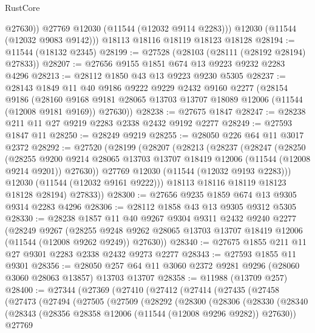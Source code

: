 \begin{lexlean}{RustCore}
\begin{coremodule}
            @27630))
        @27769
        @12030
        (@11544 (@12032 @9114 @2283)))
      @12030
      (@11544 (@12032 @9083 @9142)))
    @18113
    @18116
    @18119
    @18123
    @18128
@28194 := @11544 (@18132 @2345)
@28199 := @27528 (@28103 (@28111 (@28192 @28194) @27833))
@28207 := @27656 @9155 @1851 @674 @13 @9223 @9232 @2283 @4296
@28213 := @28112 @1850 @43 @13 @9223 @9230 @5305
@28237 := @28143
    @1849
    @11
    @40
    @9186
    @9222
    @9229
    @2432
    @9160
    @2277
    (@28154
      @9186
      (@28160 @9168 @9181 @28065 @13703 @13707 @18089 @12006 (@11544 (@12008 @9181 @9169)) @27630))
@28238 := @27675 @1847
@28247 := @28238 @211 @11 @27 @9219 @2283 @2338 @2432 @9192 @2277
@28249 := @27593 @1847 @11
@28250 := @28249 @9219
@28255 := @28050 @226 @64 @11 @3017 @2372
@28292 := @27520
    (@28199
      (@28207
        (@28213
          (@28237
            (@28247
              (@28250
                (@28255
                  @9200
                  @9214
                  @28065
                  @13703
                  @13707
                  @18419
                  @12006
                  (@11544 (@12008 @9214 @9201))
                  @27630))
              @27769
              @12030
              (@11544 (@12032 @9193 @2283)))
            @12030
            (@11544 (@12032 @9161 @9222)))
          @18113
          @18116
          @18119
          @18123
          @18128
          @28194)
        @27833))
@28300 := @27656 @9235 @1859 @674 @13 @9305 @9314 @2283 @4296
@28306 := @28112 @1858 @43 @13 @9305 @9312 @5305
@28330 := @28238
    @1857
    @11
    @40
    @9267
    @9304
    @9311
    @2432
    @9240
    @2277
    (@28249
      @9267
      (@28255 @9248 @9262 @28065 @13703 @13707 @18419 @12006 (@11544 (@12008 @9262 @9249)) @27630))
@28340 := @27675 @1855 @211 @11 @27 @9301 @2283 @2338 @2432 @9273 @2277
@28343 := @27593 @1855 @11 @9301
@28356 := @28050 @257 @64 @11 @3060 @2372 @9281 @9296 (@28060 @3060 @28063 @13857) @13703 @13707
@28358 := @11988 (@13709 @257)
@28400 := @27344
    (@27369
      (@27410
        (@27412
          (@27414
            (@27435
              (@27458
                (@27473
                  (@27494
                    (@27505
                      (@27509
                        (@28292
                          (@28300
                            (@28306
                              (@28330
                                (@28340
                                  (@28343
                                    (@28356 @28358 @12006 (@11544 (@12008 @9296 @9282)) @27630))
                                  @27769

\end{coremodule}
\end{lexlean}
